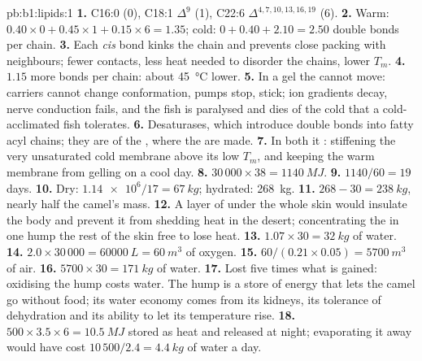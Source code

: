\begin{solution}{pb:b1:lipids:1}
\textbf{1.} C16:0 (0), C18:1 $\Delta^9$ (1), C22:6 $\Delta^{4,7,10,13,16,19}$
(6).
\textbf{2.} Warm: $0.40\times 0 + 0.45\times 1 + 0.15\times 6 = 1.35$;
cold: $0 + 0.40 + 2.10 = 2.50$ double bonds per chain.
\textbf{3.} Each \emph{cis} bond kinks the chain and prevents close
packing with neighbours; fewer  contacts, less heat needed
to disorder the chains, lower $T_m$.
\textbf{4.} $1.15$ more bonds per chain: about \qty{45}{\celsius}
lower.
\textbf{5.} In a gel the  cannot move: carriers cannot change
conformation, pumps stop,  stick; ion gradients decay, nerve
conduction fails, and the fish is paralysed and dies of the cold that
a cold-acclimated fish tolerates.
\textbf{6.} Desaturases, which introduce double bonds into fatty acyl
chains; they are  of the , where
the  are made.
\textbf{7.} In both it  : stiffening the very
unsaturated cold membrane above its low $T_m$, and keeping the warm
membrane from gelling on a cool day.
\textbf{8.} $30\,000\times 38 = \qty{1140}{MJ}$.
\textbf{9.} $1140/60 = 19$ days.
\textbf{10.} Dry: $\num{1.14e6}/17 = \qty{67}{kg}$; hydrated:
\qty{268}{kg}.
\textbf{11.} $268 - 30 = \qty{238}{kg}$, nearly half the camel's mass.
\textbf{12.} A layer of  under the whole skin would insulate the
body and prevent it from shedding heat in the desert; concentrating
the  in one hump  the rest of the skin free to lose heat.
\textbf{13.} $1.07\times 30 = \qty{32}{kg}$ of water.
\textbf{14.} $2.0\times 30\,000 = \qty{60000}{L} = \qty{60}{m^3}$ of
oxygen.
\textbf{15.} $60/(0.21\times 0.05) = \qty{5700}{m^3}$ of air.
\textbf{16.} $5700\times 30 = \qty{171}{kg}$ of water.
\textbf{17.} Lost five times what is gained: oxidising the hump costs
water. The hump is a store of energy that lets the camel go without
food; its water economy comes from its kidneys, its tolerance of
dehydration and its ability to let its temperature rise.
\textbf{18.} $500\times 3.5\times 6 = \qty{10.5}{MJ}$ stored as heat and released at night; evaporating it away would have cost $10\,500/2.4 = \qty{4.4}{kg}$ of water a day.

\end{solution}
